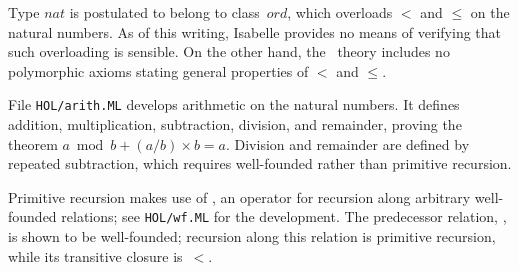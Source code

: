 Type $nat$ is postulated to belong to class~$ord$, which overloads $<$ and
$\leq$ on the natural numbers.  As of this writing, Isabelle provides no
means of verifying that such overloading is sensible.  On the other hand,
the \HOL\ theory includes no polymorphic axioms stating general properties
of $<$ and $\leq$.

File {\tt HOL/arith.ML} develops arithmetic on the natural numbers.
It defines addition, multiplication, subtraction, division, and remainder,
proving the theorem $a \bmod b + (a/b)\times b = a$.  Division and
remainder are defined by repeated subtraction, which requires well-founded
rather than primitive recursion.

Primitive recursion makes use of , an operator for recursion
along arbitrary well-founded relations; see {\tt HOL/wf.ML} for the
development.  The predecessor relation, , is shown to
be well-founded; recursion along this relation is primitive recursion,
while its transitive closure is~$<$.


